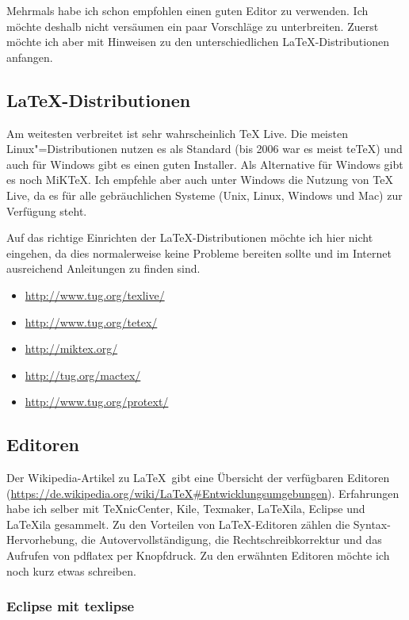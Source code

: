 Mehrmals habe ich schon empfohlen einen guten Editor zu verwenden. Ich möchte deshalb nicht versäumen ein paar Vorschläge zu unterbreiten. Zuerst möchte ich aber mit Hinweisen zu den unterschiedlichen \LaTeX-Distributionen anfangen.

\subsection{\LaTeX-Distributionen}

Am weitesten verbreitet ist sehr wahrscheinlich TeX Live. Die meisten Linux"=Distributionen nutzen es als Standard (bis 2006 war es meist teTeX) und auch für Windows gibt es einen guten Installer. Als Alternative für Windows gibt es noch MiKTeX. Ich empfehle aber auch unter Windows die Nutzung von TeX Live, da es für alle gebräuchlichen Systeme (Unix, Linux, Windows und Mac) zur Verfügung steht.

Auf das richtige Einrichten der \LaTeX-Distributionen möchte ich hier nicht eingehen, da dies normalerweise keine Probleme bereiten sollte und im Internet ausreichend Anleitungen zu finden sind.

\begin{itemize}
    \item \url{http://www.tug.org/texlive/}
    \item \url{http://www.tug.org/tetex/}
    \item \url{http://miktex.org/}
    \item \url{http://tug.org/mactex/}
    \item \url{http://www.tug.org/protext/}
\end{itemize}

\subsection{Editoren}

Der Wikipedia-Artikel zu \LaTeX\ gibt eine Übersicht der verfügbaren Editoren (\url{https://de.wikipedia.org/wiki/LaTeX#Entwicklungsumgebungen}). Erfahrungen habe ich selber mit TeXnicCenter, Kile, Texmaker, LaTeXila, Eclipse und LaTeXila gesammelt. Zu den Vorteilen von \LaTeX-Editoren zählen die Syntax-Hervorhebung, die Autovervollständigung, die Rechtschreibkorrektur und das Aufrufen von pdflatex per Knopfdruck. Zu den erwähnten Editoren möchte ich noch kurz etwas schreiben.

\subsubsection{Eclipse mit texlipse}

